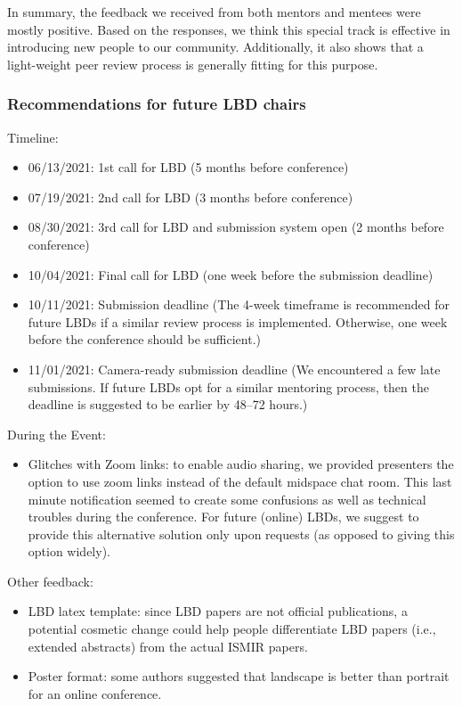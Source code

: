 \documentclass[%
10pt,								%
titlepage,						%
]
{scrartcl}
\begin{document}
            In summary, the feedback we received from both mentors and mentees were mostly positive. Based on the responses, we think this special track is effective in introducing new people to our community. Additionally, it also shows that a light-weight peer review process is generally fitting for this purpose. 
        
        \subsubsection{Recommendations for future LBD chairs}
            Timeline:
            \begin{itemize}
                \item   06/13/2021: 1st call for LBD (5 months before conference)
                \item   07/19/2021: 2nd call for LBD (3 months before conference)
                \item   08/30/2021: 3rd call for LBD and submission system open (2 months before conference)
                \item   10/04/2021: Final call for LBD (one week before the submission deadline)
                \item   10/11/2021: Submission deadline (The 4-week timeframe is recommended for future LBDs if a similar review process is implemented. Otherwise, one week before the conference should be sufficient.)
                \item   11/01/2021: Camera-ready submission deadline (We encountered a few late submissions. If future LBDs opt for a similar mentoring process, then the deadline is suggested to be earlier by 48--72 hours.)
            \end{itemize}
            
            During the Event:
            \begin{itemize}
                \item Glitches with Zoom links: to enable audio sharing, we provided presenters the option to use zoom links instead of the default midspace chat room. This last minute notification seemed to create some confusions as well as technical troubles during the conference. For future (online) LBDs, we suggest to provide this alternative solution only upon requests (as opposed to giving this option widely). 
            \end{itemize}
            
            Other feedback:
            \begin{itemize}
                \item   LBD latex template: since LBD papers are not official publications, a potential cosmetic change could help people differentiate LBD papers (i.e., extended abstracts) from the actual ISMIR papers. 
                \item   Poster format: some authors suggested that landscape is better than portrait for an online conference.
            \end{itemize}
    
\end{document}

